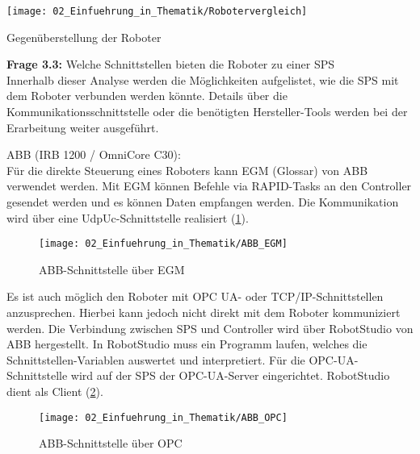 		\begin{table}[h!]
			\centering
			\texttt{[image: 02\_Einfuehrung\_in\_Thematik/Robotervergleich]}
			\captionsetup{justification=centering}
			\caption{Gegenüberstellung der Roboter}
			\label{tab:Robotervergleich}
		\end{table}
	\vspace{3mm}
	
	\newpage
	
	\textbf{Frage 3.3:} Welche Schnittstellen bieten die Roboter zu einer SPS \vspace{2mm} 
	\\
		Innerhalb dieser Analyse werden die Möglichkeiten aufgelistet, wie die SPS mit dem Roboter verbunden werden könnte. Details über die Kommunikationsschnittstelle oder die benötigten Hersteller-Tools werden bei der Erarbeitung weiter ausgeführt.  
		\vspace{3mm}
		
		ABB (IRB 1200 / OmniCore C30):
		\vspace{2mm}
		\\
		Für die direkte Steuerung eines Roboters kann EGM (Glossar) von ABB verwendet werden.   Mit EGM können Befehle via RAPID-Tasks an den Controller gesendet werden und es können Daten empfangen werden. Die Kommunikation wird über eine UdpUc-Schnittstelle realisiert (\ref{fig:ABB_EGM}). 
		
		\begin{figure}[h!]
			\centering
			\texttt{[image: 02\_Einfuehrung\_in\_Thematik/ABB\_EGM]}
			\captionsetup{justification=centering}
			\caption{ABB-Schnittstelle über EGM}
			\label{fig:ABB_EGM}
		\end{figure}
		
		Es ist auch möglich den Roboter mit OPC UA- oder TCP/IP-Schnittstellen anzusprechen. Hierbei kann jedoch nicht direkt mit dem Roboter kommuniziert werden. Die Verbindung zwischen SPS und Controller wird über RobotStudio von ABB hergestellt. In RobotStudio muss ein Programm laufen, welches die Schnittstellen-Variablen auswertet und interpretiert. Für die OPC-UA-Schnittstelle wird auf der SPS der OPC-UA-Server eingerichtet. RobotStudio dient als Client (\ref{fig:ABB_OPC}).
		
		\begin{figure}[h!]
			\centering
			\texttt{[image: 02\_Einfuehrung\_in\_Thematik/ABB\_OPC]}
			\caption{ABB-Schnittstelle über OPC}
			\label{fig:ABB_OPC}
		\end{figure}
		\vspace{3mm}
		
